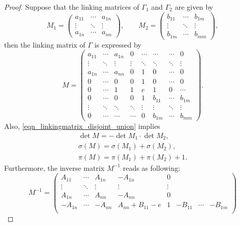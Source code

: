 \documentclass[pdftex]{sigma}
\numberwithin{equation}{section}
\begin{document}
\begin{proof}
	Suppose that the linking matrices of $ \Gamma_1 $ and $ \Gamma_2 $ are given by
	\[
	M_1=\begin{pmatrix}
		a_{11}&\cdots &a_{1n}\\
		\vdots&\ddots&\vdots\\
		a_{1n}&\cdots&a_{nn}
	\end{pmatrix},\qquad M_2=\begin{pmatrix}
		b_{11}&\cdots &b_{1m}\\
		\vdots&\ddots&\vdots\\
		b_{1m}&\cdots&b_{mm}
	\end{pmatrix},
	\]
	then the linking matrix of $ \Gamma $ is expressed by
	\begin{equation}\label{eqn_linkingmatrix_disjoint_union}
		M=\begin{pmatrix}
			a_{11}&\cdots &a_{1n}&0&\cdots&\cdots&\cdots&0\\
			\vdots&\ddots&\vdots&\vdots&\ddots&\ddots&\ddots&\vdots\\
			a_{1n}&\cdots&a_{nn}&0&1&0&\cdots&0\\
			0&\cdots&0&0&1&0&\cdots&0\\
			0&\cdots&1&1&e&1&0&\cdots\\
			0&\cdots&0&0&1&b_{11}&\cdots&b_{1m}\\
			\vdots&\ddots&\ddots&\ddots&\vdots&\vdots&\ddots&\vdots\\
			0&\cdots&\cdots&\cdots&0&b_{1m}&\cdots&b_{mm}
		\end{pmatrix}.
	\end{equation}
	Also, \eqref{eqn_linkingmatrix_disjoint_union} implies
	\begin{gather}
			\det M =-\det M_1\cdot \det M_2,\nonumber\\
			\sigma(M) =\sigma(M_1)+\sigma(M_2),\nonumber\\
			\pi(M) =\pi(M_1)+\pi(M_2)+1.\label{eqn_properties_linkingmatrix_disjoint_union}
		\end{gather}
	Furthermore, the inverse matrix $ M^{-1} $ reads as following:
	\begin{equation}\label{eqn_inverse_linkingmatrix_disjoint_union}
		M^{-1}=\begin{pmatrix}
			A_{11}&\cdots&A_{1n}&-A_{1n}&0&&&\\
			\vdots&\ddots&\vdots&\vdots&\vdots&&&\\
			A_{1n}&\cdots&A_{nn}&-A_{nn}&0&&&\\
			-A_{1n}&\cdots&-A_{nn}&A_{nn}+B_{11}-e&1&-B_{11}&\cdots&-B_{1m}\\

\end{pmatrix}
\end{equation}
\end{proof}
\end{document}
